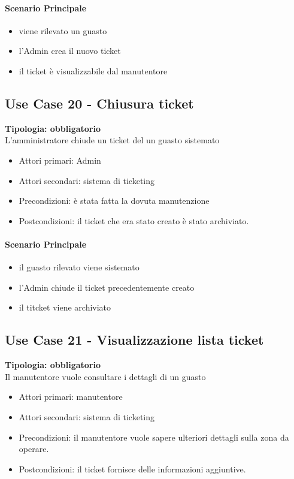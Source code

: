 \documentclass[12pt]{article}
\begin{document}
\paragraph{Scenario Principale}
\begin{itemize}
	\item viene rilevato un guasto
	\item l'Admin crea il nuovo ticket
	\item il ticket è visualizzabile dal manutentore
\end{itemize}


\subsection{Use Case 20 - Chiusura ticket}
\textbf{Tipologia: obbligatorio}\\
L'amministratore chiude un ticket del un guasto sistemato
\begin{itemize}
	\item Attori primari: Admin
	\item Attori secondari: sistema di ticketing
	\item Precondizioni: è stata fatta la dovuta manutenzione
	\item Postcondizioni: il ticket che era stato creato è stato archiviato. 
\end{itemize}
\paragraph{Scenario Principale}
\begin{itemize}
	\item il guasto rilevato viene sistemato
	\item l'Admin chiude il ticket precedentemente creato
	\item il titcket viene archiviato
\end{itemize}


\subsection{Use Case 21 - Visualizzazione lista ticket}
\textbf{Tipologia: obbligatorio}\\
Il manutentore vuole consultare i dettagli di un guasto
\begin{itemize}
	\item Attori primari: manutentore
	\item Attori secondari: sistema di ticketing
	\item Precondizioni: il manutentore vuole sapere ulteriori dettagli sulla zona da operare.
	\item Postcondizioni: il ticket fornisce delle informazioni aggiuntive.
\end{itemize}
\end{document}
